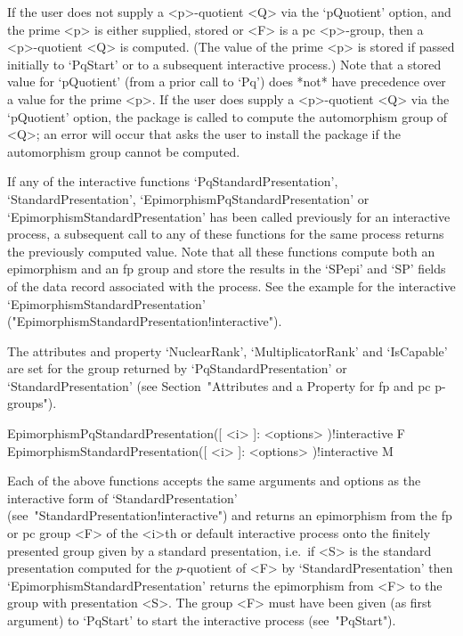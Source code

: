 If the user does not  supply  a  <p>-quotient  <Q>  via  the  `pQuotient'
option, and the prime <p> is either supplied,  stored  or  <F>  is  a  pc
<p>-group, then a <p>-quotient <Q> is computed. (The value of  the  prime
<p> is stored if  passed  initially  to  `PqStart'  or  to  a  subsequent
interactive process.) Note that a stored value for  `pQuotient'  (from  a
prior call to `Pq') does *not* have precedence over a value for the prime
<p>. If the user does supply  a  <p>-quotient  <Q>  via  the  `pQuotient'
option, the package {\AutPGrp} is  called  to  compute  the  automorphism
group of <Q>; an error will occur that  asks  the  user  to  install  the
package {\AutPGrp} if the automorphism group cannot be computed.

If   any   of   the   interactive   functions   `PqStandardPresentation',
`StandardPresentation',      `EpimorphismPqStandardPresentation'       or
`EpimorphismStandardPresentation'  has  been  called  previously  for  an
interactive process, a subsequent call to any of these functions for  the
same process returns the previously computed value. Note that  all  these
functions compute both an epimorphism and  an  fp  group  and  store  the
results in the `SPepi' and `SP' fields of the data record associated with
the    process.    See    the     example     for     the     interactive
`EpimorphismStandardPresentation'
("EpimorphismStandardPresentation!interactive").

The  attributes  and  property  `NuclearRank',  `MultiplicatorRank'   and
`IsCapable' are set for the group returned by `PqStandardPresentation' or
`StandardPresentation' (see Section~"Attributes and a Property for fp and  
pc p-groups").

\>EpimorphismPqStandardPresentation([ <i> ]: <options> )!{interactive} F
\>EpimorphismStandardPresentation([ <i> ]: <options> )!{interactive} M

Each of the above functions accepts the same arguments and options as the
interactive           form           of            `StandardPresentation'
(see~"StandardPresentation!interactive") and returns an epimorphism  from
the fp or pc group <F> of  the  <i>th  or  default  interactive  {\ANUPQ}
process  onto  the  finitely  presented  group  given   by   a   standard
presentation, i.e.~if <S> is the standard presentation computed  for  the
$p$-quotient     of     <F>      by      `StandardPresentation'      then
`EpimorphismStandardPresentation' returns the epimorphism from <F> to the
group with presentation <S>. The group <F> must have been given (as first
argument)  to  `PqStart'  to  start  the  interactive  {\ANUPQ}   process
(see~"PqStart").

